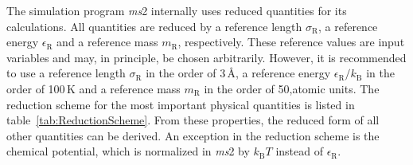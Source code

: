 The simulation program \textit{ms}2 internally uses reduced quantities for its calculations. All quantities are reduced by a reference length $\sigma_{\text{R}}$, a reference energy $\epsilon_{\text{R}}$ and a reference mass $m_{\text{R}}$, respectively. These reference values are input variables and may, in principle, be chosen arbitrarily. However, it is recommended to use a reference length $\sigma_{\text{R}}$ in the order of 3\,\AA, a reference energy $\epsilon_{\text{R}}/ k_{\text{B}}$ in the order of 100\,K and a reference mass $m_{\text{R}}$ in the order of 50,atomic units. The reduction scheme for the most important physical quantities is listed in table~\ref{tab:ReductionScheme}. From these properties, the reduced form of all other quantities can be derived. An exception in the reduction scheme is the chemical potential, which is normalized in \textit{ms}2 by $k_{\text{B}}T$ instead of $\epsilon_{\text{R}}$.

\renewcommand{\arraystretch}{1.5}
	
